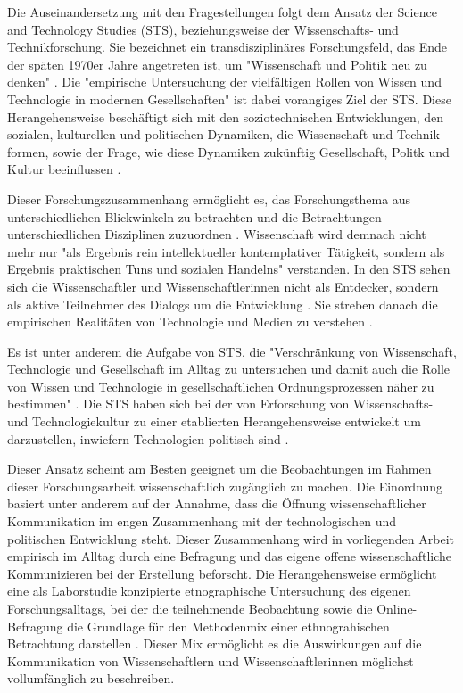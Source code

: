 Die Auseinandersetzung mit den Fragestellungen folgt dem Ansatz der Science and Technology Studies (STS), beziehungsweise der Wissenschafts- und Technikforschung. Sie bezeichnet ein transdisziplinäres Forschungsfeld, das Ende der späten 1970er Jahre angetreten ist, um "Wissenschaft und Politik neu zu denken" \cite{Potthast_2010}. Die "empirische Untersuchung der vielfältigen Rollen von Wissen und Technologie in modernen Gesellschaften" \cite{beck_2014_science} ist dabei vorangiges Ziel der STS. Diese Herangehensweise beschäftigt sich mit den soziotechnischen Entwicklungen, den sozialen, kulturellen und politischen Dynamiken, die Wissenschaft und Technik formen, sowie der Frage, wie diese Dynamiken zukünftig Gesellschaft, Politk und Kultur beeinflussen \cite{Potthast_2010}.

Dieser Forschungszusammenhang ermöglicht es, das Forschungsthema aus unterschiedlichen Blickwinkeln zu betrachten und die Betrachtungen unterschiedlichen Disziplinen zuzuordnen \cite{beck_2014_science}  \cite{Potthast_2010}. Wissenschaft wird demnach nicht mehr nur "als Ergebnis rein intellektueller kontemplativer Tätigkeit, sondern als Ergebnis praktischen Tuns und sozialen Handelns" \cite{beck_2014_science} verstanden. In den STS sehen sich die Wissenschaftler und Wissenschaftlerinnen nicht als Entdecker, sondern als aktive Teilnehmer des Dialogs um die Entwicklung \cite{MacKenzie_STS_1999}. Sie streben danach die empirischen Realitäten von Technologie und Medien zu verstehen \cite{kelty_2014_freedom}.

Es ist unter anderem die Aufgabe von STS, die "Verschränkung von Wissenschaft, Technologie und Gesellschaft im Alltag zu untersuchen und damit auch die Rolle von Wissen und Technologie in gesellschaftlichen Ordnungsprozessen näher zu bestimmen" \cite{beck_2014_science}. Die STS haben sich bei der von Erforschung von Wissenschafts- und Technologiekultur zu einer etablierten Herangehensweise entwickelt um darzustellen, inwiefern Technologien politisch sind \cite{kelty_2014_freedom}.

Dieser Ansatz scheint am Besten geeignet um die Beobachtungen im Rahmen dieser Forschungsarbeit wissenschaftlich zugänglich zu machen. Die Einordnung basiert unter anderem auf der Annahme, dass die Öffnung wissenschaftlicher Kommunikation im engen Zusammenhang mit der technologischen und politischen Entwicklung steht. Dieser Zusammenhang wird in vorliegenden Arbeit empirisch im Alltag durch eine Befragung und das eigene offene wissenschaftliche Kommunizieren bei der Erstellung beforscht. Die Herangehensweise ermöglicht eine als Laborstudie konzipierte etnographische Untersuchung des eigenen Forschungsalltags, bei der die teilnehmende Beobachtung sowie die Online-Befragung die Grundlage für den Methodenmix einer ethnograhischen Betrachtung darstellen \cite{bachmann_2011_ethnographie}. Dieser Mix ermöglicht es die Auswirkungen auf die Kommunikation von Wissenschaftlern und Wissenschaftlerinnen möglichst vollumfänglich zu beschreiben.

